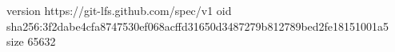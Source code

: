 version https://git-lfs.github.com/spec/v1
oid sha256:3f2dabe4cfa8747530ef068acffd31650d3487279b812789bed2fe18151001a5
size 65632
